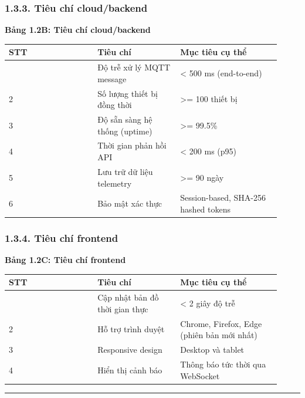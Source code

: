 \documentclass[13pt,a4paper]{extarticle}
\newcounter{none} %
\newcommand{\thesislongtableorignewline}{}
\let\thesislongtableorignewline\\
\renewcommand{\\}{\thesislongtableorignewline\hline}%
\let\\\thesislongtableorignewline
\newcommand{\thesistabletitle}[1]{%
  \begin{center}\textbf{#1}\end{center}%
}
\begin{document}
\subsubsection{1.3.3. Tiêu chí
cloud/backend}\label{133-tiuxeau-chuxed-cloudbackend}

\thesistabletitle{Bảng 1.2B: Tiêu chí cloud/backend}

{\def\LTcaptype{none} %
\begin{longtable}{|p{0.30\linewidth}|p{0.28\linewidth}|p{0.34\linewidth}|}
\hline \textbf{STT} & \textbf{Tiêu chí} & \textbf{Mục tiêu cụ thể} \\
\hline
\endhead
\hline
\endlastfoot
1 & Độ trễ xử lý MQTT message & \textless{} 500 ms (end-to-end) \\
2 & Số lượng thiết bị đồng thời & \textgreater= 100 thiết bị \\
3 & Độ sẵn sàng hệ thống (uptime) & \textgreater= 99.5\% \\
4 & Thời gian phản hồi API & \textless{} 200 ms (p95) \\
5 & Lưu trữ dữ liệu telemetry & \textgreater= 90 ngày \\
6 & Bảo mật xác thực & Session-based, SHA-256 hashed tokens \\
\end{longtable}
}

\subsubsection{1.3.4. Tiêu chí
frontend}\label{134-tiuxeau-chuxed-frontend}

\thesistabletitle{Bảng 1.2C: Tiêu chí frontend}

{\def\LTcaptype{none} %
\begin{longtable}{|p{0.30\linewidth}|p{0.28\linewidth}|p{0.34\linewidth}|}
\hline \textbf{STT} & \textbf{Tiêu chí} & \textbf{Mục tiêu cụ thể} \\
\hline
\endhead
\hline
\endlastfoot
1 & Cập nhật bản đồ thời gian thực & \textless{} 2 giây độ trễ \\
2 & Hỗ trợ trình duyệt & Chrome, Firefox, Edge (phiên bản mới nhất) \\
3 & Responsive design & Desktop và tablet \\
4 & Hiển thị cảnh báo & Thông báo tức thời qua WebSocket \\
\end{longtable}
}

\begin{center}\rule{0.5\linewidth}{0.5pt}\end{center}
\end{document}
